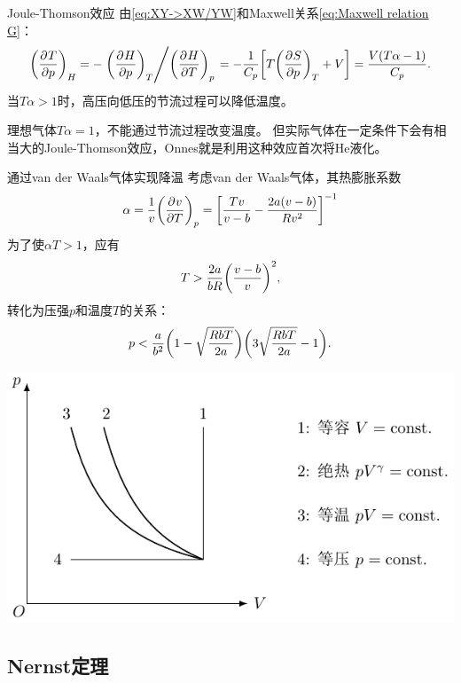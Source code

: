 \begin{theorem}
	{Joule-Thomson效应}{}
	由\eqref{eq:XY->XW/YW}和Maxwell关系\eqref{eq:Maxwell relation G}：
	\begin{equation}
		\pu[H]Tp=-\division{\pu[T]Hp}{\pu[p]HT}=-\frac1{C_p}\biggfkh{T\pu[T]Sp+V}=\frac{V(T\alpha-1)}{C_p}.
	\end{equation}
	当$T\alpha>1$时，高压向低压的节流过程可以降低温度。
\end{theorem}
\begin{remark}
	理想气体$T\alpha=1$，不能通过节流过程改变温度。
	但实际气体在一定条件下会有相当大的Joule-Thomson效应，Onnes就是利用这种效应首次将He液化。
\end{remark}

\begin{example}
	{通过van der Waals气体实现降温}{}
	考虑van der Waals气体，其热膨胀系数
	\[
		\alpha=\frac1v\pu[p]vT=\fkh{\frac{Tv}{v-b}-\frac{2a(v-b)}{Rv^2}}^{-1}
	\]
	为了使$\alpha T>1$，应有
	\[
		T>\frac{2a}{bR}\biggkh{\frac{v-b}v}^2,
	\]
	转化为压强$p$和温度$T$的关系：
	\[
		p<\frac a{b^2}\biggkh{1-\sqrt{\frac{RbT}{2a}}}\biggkh{3\sqrt{\frac{RbT}{2a}}-1}.
	\]
	\begin{center}
		\includegraphics[page=5]{figures/tikz/coordinates.pdf}
	\end{center}
\end{example}

\subsection{Nernst定理}

